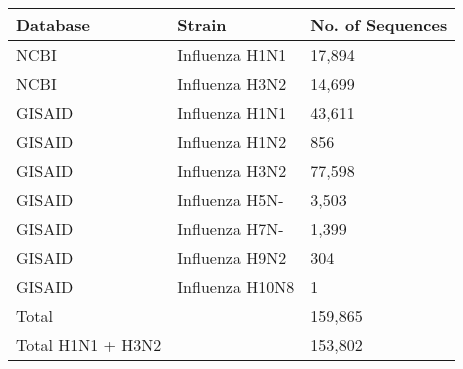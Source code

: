 \begin{tabular}{L{1in}|L{1.2in}|L{.95in}}\hline
Database & Strain & No. of Sequences \\\hline
NCBI& Influenza  H1N1 &17,894\\\hline
NCBI& Influenza  H3N2 &14,699\\\hline
GISAID& Influenza  H1N1  &43,611\\\hline
GISAID& Influenza  H1N2  &	
856\\\hline
GISAID& Influenza  H3N2  &	
77,598\\\hline
GISAID& Influenza  H5N-  &	
3,503\\\hline
GISAID& Influenza  H7N-  &	
1,399 \\\hline
GISAID& Influenza  H9N2  &	
304\\\hline
GISAID& Influenza  H10N8  &	
1\\\hline
Total & &159,865\\\hline
Total H1N1 + H3N2 & &153,802\\\hline
\end{tabular}